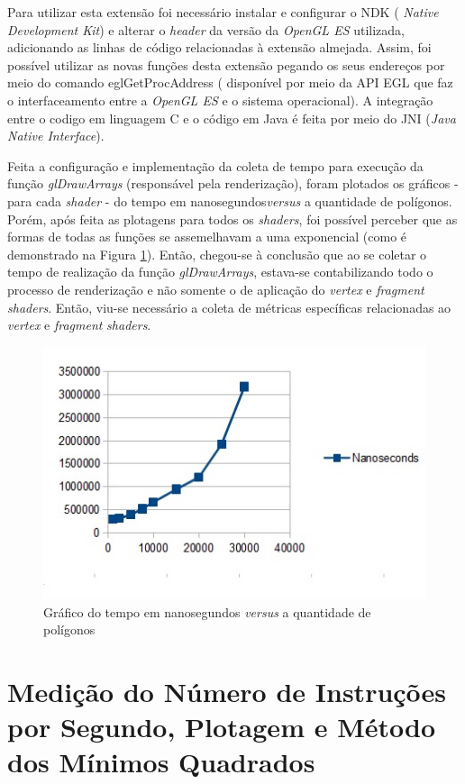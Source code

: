 	Para utilizar esta extensão foi necessário instalar e configurar o NDK ( \textit{Native Development Kit}) e alterar o \textit{header} da versão da \textit{OpenGL ES} utilizada, adicionando as linhas de código relacionadas à extensão almejada. Assim, foi possível utilizar as novas funções desta extensão pegando os seus endereços por meio do comando eglGetProcAddress ( disponível por meio da API EGL que faz o interfaceamento entre a \textit{OpenGL ES} e o sistema operacional). A integração entre o codigo em linguagem C e o código em Java é feita por meio do JNI (\textit{Java Native Interface}).

	Feita a configuração e implementação da coleta de tempo para execução da função \textit{glDrawArrays} (responsável pela renderização), foram plotados os gráficos - para cada \textit{shader} - do tempo em nanosegundos\textit{versus} a quantidade de polígonos. Porém, após feita as plotagens para todos os \textit{shaders}, foi possível perceber que as formas de todas as funções se assemelhavam a uma exponencial (como é demonstrado na Figura  \ref{ndk_exp}).  Então, chegou-se à conclusão que ao se coletar o tempo de realização da função \textit{glDrawArrays}, estava-se contabilizando todo o processo de renderização e não somente o de aplicação do \textit{vertex} e  \textit{fragment}  \textit{shaders}. Então, viu-se necessário a coleta de métricas específicas relacionadas ao \textit{vertex} e \textit{fragment} \textit{shaders}. 

	\begin{figure}[h]
	\centering
		\includegraphics[keepaspectratio=true,scale=1.0]{figuras/ndk_exp.jpg}
	\caption{Gráfico do tempo em nanosegundos \textit{versus} a quantidade de polígonos}
	\label{ndk_exp}
	\end{figure}

\section{Medição do Número de Instruções por Segundo, Plotagem e Método dos Mínimos Quadrados}

